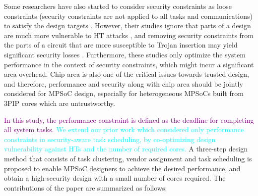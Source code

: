 \documentclass[10pt,journal, compsoc]{IEEEtran}
\begin{document}
Some researchers have also started to consider security constraints as loose constraints (security constraints are not applied to all tasks and communications) to satisfy the design targets \cite{article:CL, article:NW, conference:NW}. However, their studies ignore that parts of a design are much more vulnerable to HT attacks \cite{conference:HS}, and removing security constraints from the parts of a circuit that are more susceptible to Trojan insertion may yield significant security losses \cite{article:XC}. Furthermore, these studies only optimize the system performance in the context of security constraints, which might incur a significant area overhead. Chip area is also one of the critical issues towards trusted design, and therefore, performance and security along with chip area should be jointly considered for MPSoC design, especially for heterogeneous MPSoCs built from 3PIP cores which are untrustworthy.




\textcolor{purple}{In this study, the performance constraint is defined as the deadline for completing all system tasks.}
\textcolor{cyan}{We extend our prior work \cite{conference:NW} which considered only performance constraints in security-aware task scheduling, by co-optimizing design vulnerability against HTs and the number of required cores.} A three-step design method that consists of task clustering, vendor assignment and task scheduling is proposed to enable MPSoC designers to achieve the desired performance, and obtain a high-security design with a small number of cores required. The contributions of the paper are summarized as follows:
\end{document}
